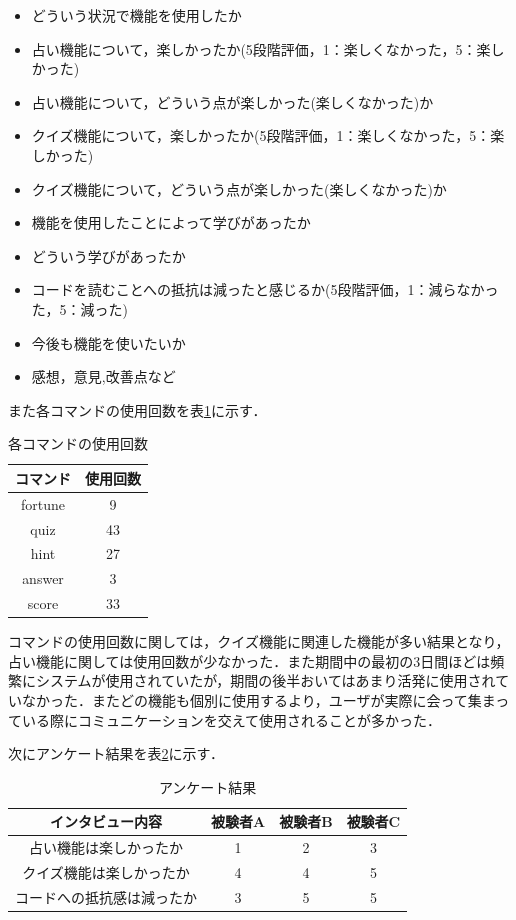 \begin{itemize}
  \item どういう状況で機能を使用したか
  \item 占い機能について，楽しかったか(5段階評価，1：楽しくなかった，5：楽しかった)
  \item 占い機能について，どういう点が楽しかった(楽しくなかった)か
  \item クイズ機能について，楽しかったか(5段階評価，1：楽しくなかった，5：楽しかった)
  \item クイズ機能について，どういう点が楽しかった(楽しくなかった)か
  \item 機能を使用したことによって学びがあったか
  \item どういう学びがあったか
  \item コードを読むことへの抵抗は減ったと感じるか(5段階評価，1：減らなかった，5：減った)
  \item 今後も機能を使いたいか
  \item 感想，意見,改善点など
\end{itemize}

また各コマンドの使用回数を表\ref{command}に示す．

\begin{table}[H]
  \centering
  \caption{各コマンドの使用回数}
  \label{command}
    \begin{tabular}{|c|c|} \hline
      コマンド & 使用回数 \\ \hline \hline
      fortune & 9 \\ \hline
      quiz & 43 \\ \hline
      hint & 27 \\ \hline
      answer & 3 \\ \hline
      score & 33 \\ \hline
    \end{tabular}
\end{table}

コマンドの使用回数に関しては，クイズ機能に関連した機能が多い結果となり，占い機能に関しては使用回数が少なかった．また期間中の最初の3日間ほどは頻繁にシステムが使用されていたが，期間の後半おいてはあまり活発に使用されていなかった．またどの機能も個別に使用するより，ユーザが実際に会って集まっている際にコミュニケーションを交えて使用されることが多かった．

次にアンケート結果を表\ref{interview}に示す．
\begin{table}[!ht]
  \centering
  \caption{アンケート結果}
  \label{interview}
    \begin{tabular}{|c|c|c|c|} \hline
      インタビュー内容 & 被験者A & 被験者B & 被験者C \\ \hline \hline
      占い機能は楽しかったか & 1 & 2 & 3 \\ \hline
      クイズ機能は楽しかったか & 4 & 4 & 5 \\ \hline
      コードへの抵抗感は減ったか & 3 & 5 &5 \\ \hline
    \end{tabular}
\end{table}

